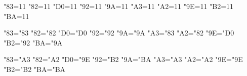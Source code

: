 %
%
% 
%
%
 
\catcode"83=11  %
\catcode"82=11  %
\catcode"D0=11  %
\catcode"92=11  %
\catcode"9A=11  %
\catcode"A3=11  %
\catcode"A2=11  %
\catcode"9E=11  %
\catcode"B2=11  %
\catcode"BA=11  %

\uccode"83="83
\uccode"82="82
\uccode"D0="D0
\uccode"92="92
\uccode"9A="9A
\uccode"A3="83
\uccode"A2="82
\uccode"9E="D0
\uccode"B2="92
\uccode"BA="9A

\lccode"83="A3
\lccode"82="A2
\lccode"D0="9E
\lccode"92="B2
\lccode"9A="BA
\lccode"A3="A3
\lccode"A2="A2
\lccode"9E="9E
\lccode"B2="B2
\lccode"BA="BA

